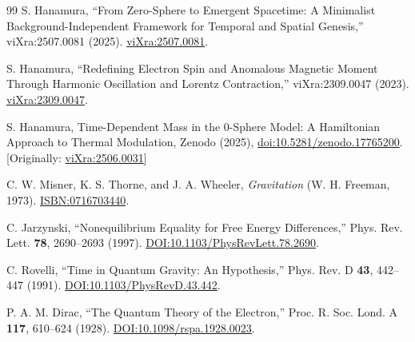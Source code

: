 \documentclass[%
 reprint,
 amsmath,amssymb,
 aps,
]{revtex4-1}
\numberwithin{equation}{section}%
\begin{document}
\begin{thebibliography}{99}
S. Hanamura, ``From Zero-Sphere to Emergent Spacetime: A Minimalist Background-Independent Framework for Temporal and Spatial Genesis,'' viXra:2507.0081 (2025). \href{https://vixra.org/abs/2507.0081}{viXra:2507.0081}.

S. Hanamura, ``Redefining Electron Spin and Anomalous Magnetic Moment Through Harmonic Oscillation and Lorentz Contraction,'' viXra:2309.0047 (2023). \href{https://vixra.org/abs/2309.0047}{viXra:2309.0047}.

S. Hanamura, Time-Dependent Mass in the 0-Sphere Model: A Hamiltonian Approach to Thermal Modulation, Zenodo (2025), \href{https://doi.org/10.5281/zenodo.17765200}{doi:10.5281/zenodo.17765200}. [Originally: \href{https://vixra.org/abs/2506.0031}{viXra:2506.0031}]

C. W. Misner, K. S. Thorne, and J. A. Wheeler, \textit{Gravitation} (W. H. Freeman, 1973). \href{https://www.macmillanlearning.com/college/us/product/Gravitation/p/0716703440}{ISBN:0716703440}.

C. Jarzynski, ``Nonequilibrium Equality for Free Energy Differences,'' Phys. Rev. Lett. \textbf{78}, 2690--2693 (1997). \href{https://doi.org/10.1103/PhysRevLett.78.2690}{DOI:10.1103/PhysRevLett.78.2690}.

C. Rovelli, ``Time in Quantum Gravity: An Hypothesis,'' Phys. Rev. D \textbf{43}, 442--447 (1991). \href{https://doi.org/10.1103/PhysRevD.43.442}{DOI:10.1103/PhysRevD.43.442}.

P. A. M. Dirac, ``The Quantum Theory of the Electron,'' Proc. R. Soc. Lond. A \textbf{117}, 610--624 (1928). \href{https://doi.org/10.1098/rspa.1928.0023}{DOI:10.1098/rspa.1928.0023}.


\end{thebibliography}
\end{document}
